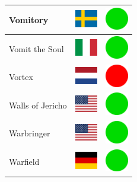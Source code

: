 \documentclass[12pt, a4paper, twoside]{report}
\begin{document}
\begin{center}
\begin{longtable}{|p{5cm}|p{2cm}|p{2cm}|}
Vomitory & \includegraphics[width=1cm]{4x3/se} & \includegraphics[width=1cm]{likes/y} \\ \hline
Vomit the Soul & \includegraphics[width=1cm]{4x3/it} & \includegraphics[width=1cm]{likes/y} \\ \hline
Vortex & \includegraphics[width=1cm]{4x3/nl} & \includegraphics[width=1cm]{likes/n} \\ \hline
Walls of Jericho & \includegraphics[width=1cm]{4x3/us} & \includegraphics[width=1cm]{likes/y} \\ \hline
Warbringer & \includegraphics[width=1cm]{4x3/us} & \includegraphics[width=1cm]{likes/y} \\ \hline
Warfield & \includegraphics[width=1cm]{4x3/de} & \includegraphics[width=1cm]{likes/y} \\ \hline

\end{longtable}
\end{center}
\end{document}
